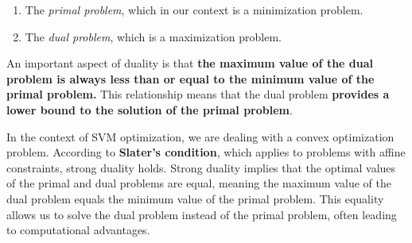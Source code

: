 \begin{enumerate}
	\item The \textit{primal problem}, which in our context is a minimization problem.
	\item The \textit{dual problem}, which is a maximization problem.
\end{enumerate}
An important aspect of duality is that \textbf{the maximum value of the dual problem is always less than or equal to the minimum value of the primal problem.} This relationship means that the dual problem \textbf{provides a lower bound to the solution of the primal problem}.

In the context of SVM optimization, we are dealing with a convex optimization problem. According to \textbf{Slater's condition}, which applies to problems with affine constraints, strong duality holds. Strong duality implies that the optimal values of the primal and dual problems are equal, meaning the maximum value of the dual problem equals the minimum value of the primal problem. This equality allows us to solve the dual problem instead of the primal problem, often leading to computational advantages.

